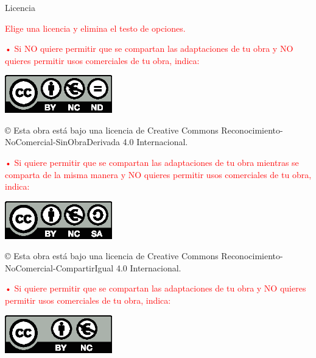 \documentclass[a4paper,12pt,oneside]{scrbook}
\begin{document}
{\noindent\LARGE Licencia}

\textcolor{red}{Elige una licencia y elimina el testo de opciones.}

\bigskip
\textcolor{red}{• Si NO quiere permitir que se compartan las adaptaciones de tu obra y NO quieres permitir usos comerciales de tu obra, indica:}

\begin{center}
\includegraphics[width=4.66cm]{images/licenses/by-nc-nd.eu}
\end{center}

\begin{large}
© Esta obra está bajo una licencia de Creative Commons Reconocimiento-NoComercial-SinObraDerivada 4.0 Internacional.
\end{large}

\bigskip
\bigskip
\bigskip
\textcolor{red}{• Si quiere permitir que se compartan las adaptaciones de tu obra mientras se comparta de la misma manera y NO quieres permitir usos comerciales de tu obra, indica:}

\begin{center}
\includegraphics[width=4.66cm]{images/licenses/by-nc-sa.eu}
\end{center}

\begin{large}
© Esta obra está bajo una licencia de Creative Commons Reconocimiento-NoComercial-CompartirIgual 4.0 Internacional.
\end{large}

\bigskip
\bigskip
\bigskip
\textcolor{red}{• Si quiere permitir que se compartan las adaptaciones de tu obra y NO quieres permitir usos comerciales de tu obra, indica:}

\begin{center}
\includegraphics[width=4.66cm]{images/licenses/by-nc.eu}
\end{center}
\end{document}
